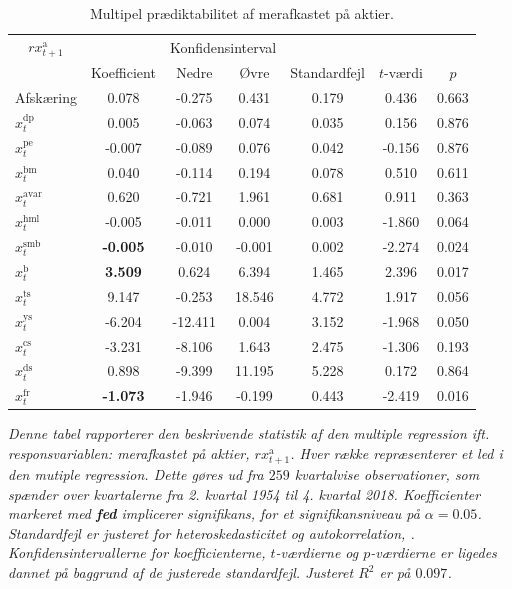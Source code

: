 \documentclass[
  a4paper,
  oneside]{memoir}
\begin{document}
\begin{table}[H]

\caption{\label{tab:MULT-ak}Multipel prædiktabilitet af merafkastet på aktier.}
\centering
\begin{threeparttable}
\begin{tabular}[t]{lcccccc}
\toprule
\multicolumn{1}{c}{$rx_{t+1}^{\text{a}}$} & \multicolumn{1}{c}{ } & \multicolumn{2}{c}{Konfidensinterval} & \multicolumn{3}{c}{ } \\
\cmidrule(l{3pt}r{3pt}){1-1} \cmidrule(l{3pt}r{3pt}){3-4}
  & Koefficient & Nedre & Øvre & Standardfejl & $t$-værdi & $p$\\
\midrule
\rowcolor{gray!6}  Afskæring & 0.078 & -0.275 & 0.431 & 0.179 & 0.436 & 0.663\\
$x_t^{\text{dp}}$ & 0.005 & -0.063 & 0.074 & 0.035 & 0.156 & 0.876\\
\rowcolor{gray!6}  $x_t^{\text{pe}}$ & -0.007 & -0.089 & 0.076 & 0.042 & -0.156 & 0.876\\
$x_t^{\text{bm}}$ & 0.040 & -0.114 & 0.194 & 0.078 & 0.510 & 0.611\\
\rowcolor{gray!6}  $x_t^{\text{avar}}$ & 0.620 & -0.721 & 1.961 & 0.681 & 0.911 & 0.363\\
$x_t^{\text{hml}}$ & -0.005 & -0.011 & 0.000 & 0.003 & -1.860 & 0.064\\
\rowcolor{gray!6}  $x_t^{\text{smb}}$ & \textbf{-0.005} & -0.010 & -0.001 & 0.002 & -2.274 & 0.024\\
$x_t^{\text{b}}$ & \textbf{ 3.509} & 0.624 & 6.394 & 1.465 & 2.396 & 0.017\\
\rowcolor{gray!6}  $x_t^{\text{ts}}$ & 9.147 & -0.253 & 18.546 & 4.772 & 1.917 & 0.056\\
$x_t^{\text{ys}}$ & -6.204 & -12.411 & 0.004 & 3.152 & -1.968 & 0.050\\
\rowcolor{gray!6}  $x_t^{\text{cs}}$ & -3.231 & -8.106 & 1.643 & 2.475 & -1.306 & 0.193\\
$x_t^{\text{ds}}$ & 0.898 & -9.399 & 11.195 & 5.228 & 0.172 & 0.864\\
\rowcolor{gray!6}  $x_t^{\text{fr}}$ & \textbf{-1.073} & -1.946 & -0.199 & 0.443 & -2.419 & 0.016\\
\bottomrule
\end{tabular}
\begin{tablenotes}
\item \textit{Denne tabel rapporterer den beskrivende statistik af den multiple regression ift. responsvariablen: merafkastet på aktier, $rx_{t+1}^{\text{a}}$. Hver række repræsenterer et led i den mutiple regression. Dette gøres ud fra $259$ kvartalvise observationer, som spænder over kvartalerne fra 2. kvartal 1954 til 4. kvartal 2018. Koefficienter markeret med \textbf{fed} implicerer signifikans, for et signifikansniveau på $\alpha=0.05$. Standardfejl er justeret for heteroskedasticitet og autokorrelation, \citep{Newey1987}. Konfidensintervallerne for koefficienterne, $t$-værdierne og $p$-værdierne er ligedes dannet på baggrund af de justerede standardfejl. Justeret $R^2$ er på $0.097$.}
\end{tablenotes}
\end{threeparttable}
\end{table}
\end{document}
